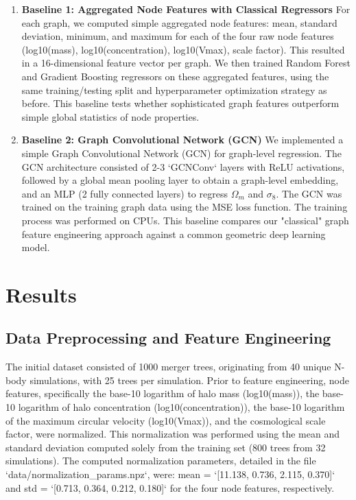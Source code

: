 \documentclass[twocolumn]{aastex631}
\begin{document}
\begin{enumerate}
    \item \textbf{Baseline 1: Aggregated Node Features with Classical Regressors}
    For each graph, we computed simple aggregated node features: mean, standard deviation, minimum, and maximum for each of the four raw node features (log10(mass), log10(concentration), log10(Vmax), scale factor). This resulted in a 16-dimensional feature vector per graph. We then trained Random Forest and Gradient Boosting regressors on these aggregated features, using the same training/testing split and hyperparameter optimization strategy as before. This baseline tests whether sophisticated graph features outperform simple global statistics of node properties.

    \item \textbf{Baseline 2: Graph Convolutional Network (GCN)}
    We implemented a simple Graph Convolutional Network (GCN) for graph-level regression. The GCN architecture consisted of 2-3 `GCNConv` layers with ReLU activations, followed by a global mean pooling layer to obtain a graph-level embedding, and an MLP (2 fully connected layers) to regress $\Omega_m$ and $\sigma_8$. The GCN was trained on the training graph data using the MSE loss function. The training process was performed on CPUs. This baseline compares our "classical" graph feature engineering approach against a common geometric deep learning model.
\end{enumerate}

\section{Results}
\label{sec:results}
\subsection{Data Preprocessing and Feature Engineering}

The initial dataset consisted of 1000 merger trees, originating from 40 unique N-body simulations, with 25 trees per simulation. Prior to feature engineering, node features, specifically the base-10 logarithm of halo mass (log10(mass)), the base-10 logarithm of halo concentration (log10(concentration)), the base-10 logarithm of the maximum circular velocity (log10(Vmax)), and the cosmological scale factor, were normalized. This normalization was performed using the mean and standard deviation computed solely from the training set (800 trees from 32 simulations). The computed normalization parameters, detailed in the file `data/normalization\_params.npz`, were: mean = `[11.138, 0.736, 2.115, 0.370]` and std = `[0.713, 0.364, 0.212, 0.180]` for the four node features, respectively.
\end{document}
